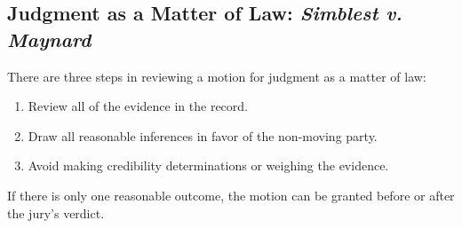 \subsection{Judgment as a Matter of Law: \emph{Simblest v. Maynard}}

There are three steps in reviewing a motion for  judgment as a matter of law:

\begin{enumerate}
    \item Review all of the evidence in the record. 
    \item Draw all reasonable inferences in favor of the non-moving party.
    \item Avoid making credibility determinations or weighing the evidence.
\end{enumerate}

If there is only one reasonable outcome, the motion can be granted before or 
after the jury's verdict.

